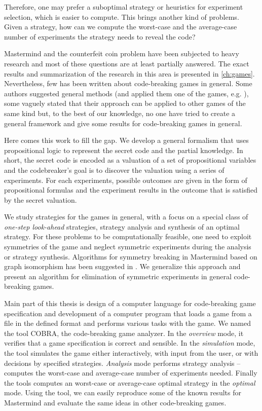 Therefore, one may prefer a suboptimal strategy or heuristics
  for experiment selection,
  which is easier to compute.
This brings another kind of problems.
Given a strategy,
  how can we compute the worst-case and the average-case number
  of experiments the strategy needs to reveal the code?

Mastermind and the counterfeit coin problem have been subjected to
heavy research and most of these questions are at least partially answered.
The exact results and summarization of the research in this area is presented
  in \autoref{ch:games}.
Nevertheless, few has been written about code-breaking games in general.
Some authors suggested general methods (and applied them one of the games,
  e.g. \cite{todo, todo}),
  some vaguely stated that their approach can be applied
  to other games of the same kind but,
  to the best of our knowledge, no one have tried to
  create a general framework and give some
   results for code-breaking games in general.

Here comes this work to fill the gap.
We develop a general formalism that uses propositional logic to
  represent the secret code and the partial knowledge.
In short, the secret code is encoded as a valuation of
  a set of propositional variables
  and the codebreaker's goal is to discover the valuation
  using a series of experiments.
For each experiments, possible outcomes are given in the form
  of propositional formulas and the experiment
  results in the outcome that is satisfied by the secret valuation.

We study strategies for the games in general, with a focus on
  a special class of \emph{one-step look-ahead} strategies,
  strategy analysis and synthesis of an optimal strategy.
For these problems to be computationally feasible, one need to exploit
  symmetries of the game and neglect symmetric experiments during the analysis
  or strategy synthesis.
Algorithms for symmetry breaking in Mastermind
  based on graph isomorphism has been suggested in \cite{todo}.
We generalize this approach and present
  an algorithm for elimination of symmetric experiments
  in general code-breaking games.

Main part of this thesis is design of a computer language for
  code-breaking game specification
  and development of a computer program that
  loads a game from a file in the defined format
  and performs various tasks with the game.
We named the tool COBRA, the code-breaking game analyzer.
In the \emph{overview} mode,
  it verifies that a game specification is correct
  and sensible.
  In the \emph{simulation} mode, the tool simulates the game
  either interactively, with input from the user, or
  with decisions by specified strategies.
\emph{Analysis} mode performs strategy analysis -- computes the worst-case and
  average-case number of experiments needed.
Finally the tools computes an worst-case or average-case optimal strategy
  in the \emph{optimal} mode.
Using the tool, we can easily reproduce some of the known results
  for Mastermind and evaluate the same ideas in other code-breaking games.

